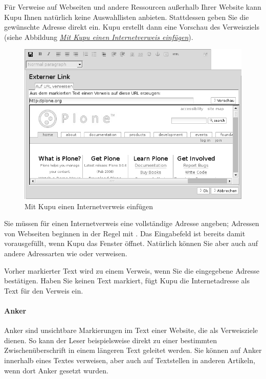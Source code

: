 \documentclass[a4paper,12pt,ngerman]{manual}
\begin{document}
Für Verweise auf Webseiten und andere Ressourcen außerhalb Ihrer Website kann
Kupu Ihnen natürlich keine Auswahllisten anbieten. Stattdessen geben Sie die
gewünschte Adresse direkt ein. Kupu erstellt dann eine Vorschau des
Verweisziels (siehe Abbildung \hyperlink{fig-kupu-ext}{\emph{Mit Kupu einen Internetverweis einfügen}}).
\hypertarget{fig-kupu-ext}{}\begin{figure}[htbp]
\centering

\includegraphics{kupu-ext.png}
\caption{Mit Kupu einen Internetverweis einfügen}\end{figure}

Sie müssen für einen Internetverweis eine vollständige Adresse angeben;
Adressen von Webseiten beginnen in der Regel mit . Das
Eingabefeld ist bereits damit vorausgefüllt, wenn Kupu das Fenster öffnet.
Natürlich können Sie aber auch auf andere Adressarten wie  oder
 verweisen.

Vorher markierter Text wird zu einem Verweis, wenn Sie die eingegebene
Adresse bestätigen. Haben Sie keinen Text markiert, fügt Kupu die
Internetadresse als Text für den Verweis ein.


\paragraph{Anker}

Anker sind unsichtbare Markierungen im Text einer Website, die als
Verweisziele dienen. So kann der Leser beispielsweise direkt zu einer
bestimmten Zwischenüberschrift in einem längeren Text geleitet werden. Sie
können auf Anker innerhalb eines Textes verweisen, aber auch auf Textstellen
in anderen Artikeln, wenn dort Anker gesetzt wurden.
\end{document}
